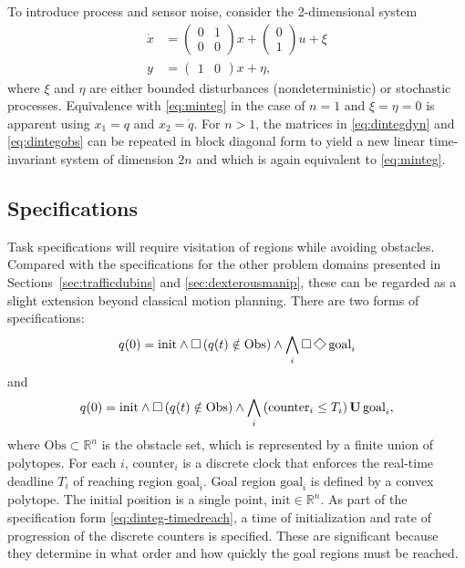\documentclass{amsart}
\theoremstyle{definition}
\begin{document}
To introduce process and sensor noise, consider the 2-dimensional system
\begin{align}
\dot{x} &= \left(
\begin{array}{cc}
0 & 1 \\
0 & 0
\end{array}
\right) x + \left(
\begin{array}{c}
0 \\
1
\end{array}
\right) u + \xi \label{eq:dintegdyn}\\
y &= \left(
\begin{array}{cc}
1 & 0
\end{array}
\right) x + \eta \label{eq:dintegobs},
\end{align}
where $\xi$ and $\eta$ are either bounded disturbances (nondeterministic) or
stochastic processes.  Equivalence with \eqref{eq:minteg} in the case of
$n=1$ and $\xi=\eta=0$ is apparent using $x_1 = q$ and $x_2 = \dot{q}$.  For $n
> 1$, the matrices in \eqref{eq:dintegdyn} and \eqref{eq:dintegobs} can be
repeated in block diagonal form to yield a new linear time-invariant system of
dimension $2n$ and which is again equivalent to \eqref{eq:minteg}.

\subsection{Specifications}

Task specifications will require visitation of regions while avoiding obstacles.
Compared with the specifications for the other problem domains presented in
Sections~\ref{sec:trafficdubins} and \ref{sec:dexterousmanip}, these can be
regarded as a slight extension beyond classical motion planning.  There are two
forms of specifications:
\begin{equation}\label{eq:dinteg-surveillance}
q(0) = \mathrm{init} \wedge \Galways \left( q(t) \notin \mathrm{Obs} \right) \wedge \bigwedge_{i} \Galways \Feventually \mathrm{goal}_i
\end{equation}
and
\begin{equation}\label{eq:dinteg-timedreach}
q(0) = \mathrm{init} \wedge \operatorname{\Box} \left( q(t) \notin \mathrm{Obs} \right) \wedge \bigwedge_{i} \left( \mathrm{counter}_i \leq T_{i} \right) \operatorname{\mathbf{U}} \mathrm{goal}_i ,
\end{equation}
where $\mathrm{Obs} \subset \mathbb{R}^n$ is the obstacle set, which is
represented by a finite union of polytopes.  For each $i$, $\mathrm{counter}_i$
is a discrete clock that enforces the real-time deadline $T_i$ of reaching
region $\mathrm{goal}_i$.  Goal region $\mathrm{goal}_i$ is defined by a convex
polytope.  The initial position is a single point, $\mathrm{init}\in
\mathbb{R}^n$.  As part of the specification form \eqref{eq:dinteg-timedreach},
a time of initialization and rate of progression of the discrete counters is
specified.  These are significant because they determine in what order and how
quickly the goal regions must be reached.
\end{document}
